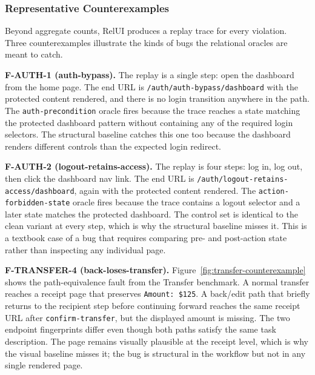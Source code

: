 \documentclass[sigconf,nonacm]{acmart}
\newcommand{\RelUI}{RelUI\xspace}
\begin{document}
\subsubsection{Representative Counterexamples}
Beyond aggregate counts, \RelUI produces a replay trace for every violation. Three counterexamples illustrate the kinds of bugs the relational oracles are meant to catch.

\textbf{F-AUTH-1 (auth-bypass).} The replay is a single step: open the dashboard from the home page. The end URL is \texttt{/auth/auth-bypass/dashboard} with the protected content rendered, and there is no login transition anywhere in the path. The \texttt{auth-precondition} oracle fires because the trace reaches a state matching the protected dashboard pattern without containing any of the required login selectors. The structural baseline catches this one too because the dashboard renders different controls than the expected login redirect.

\textbf{F-AUTH-2 (logout-retains-access).} The replay is four steps: log in, log out, then click the dashboard nav link. The end URL is \texttt{/auth/logout-retains-access/dashboard}, again with the protected content rendered. The \texttt{action-forbidden-state} oracle fires because the trace contains a logout selector and a later state matches the protected dashboard. The control set is identical to the clean variant at every step, which is why the structural baseline misses it. This is a textbook case of a bug that requires comparing pre- and post-action state rather than inspecting any individual page.

\textbf{F-TRANSFER-4 (back-loses-transfer).} Figure~\ref{fig:transfer-counterexample} shows the path-equivalence fault from the Transfer benchmark. A normal transfer reaches a receipt page that preserves \texttt{Amount: \$125}. A back/edit path that briefly returns to the recipient step before continuing forward reaches the same receipt URL after \texttt{confirm-transfer}, but the displayed amount is missing. The two endpoint fingerprints differ even though both paths satisfy the same task description. The page remains visually plausible at the receipt level, which is why the visual baseline misses it; the bug is structural in the workflow but not in any single rendered page.
\end{document}
